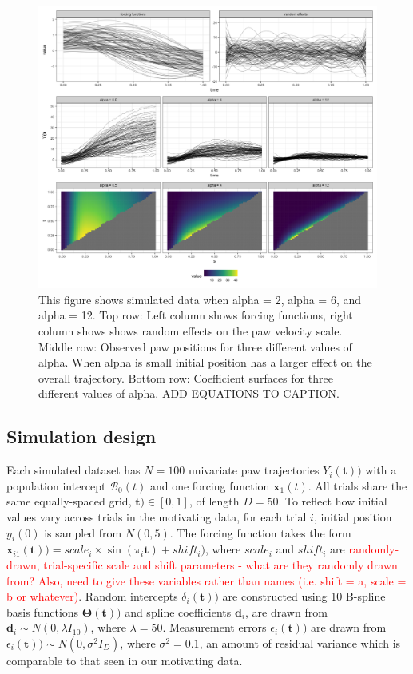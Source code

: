 \documentclass[preprint]{JASA}
\begin{document}
\begin{figure}
\includegraphics[width=\reprintcolumnwidth]{../output/fig_simdata_RE-1} \caption{This figure shows simulated data when alpha = 2, alpha = 6, and alpha = 12. Top row: Left column shows forcing functions, right column shows shows random effects on the paw velocity scale. Middle row: Observed paw positions for three different values of alpha. When alpha is small initial position has a larger effect on the overall trajectory.  Bottom row: Coefficient surfaces for three different values of alpha.  ADD EQUATIONS TO CAPTION.}\label{fig:sim_data}
\end{figure}

\hypertarget{simulation-design}{%
\subsection{Simulation design}\label{simulation-design}}

Each simulated dataset has \(N = 100\) univariate paw trajectories
\(Y_i(\mathbf{t}))\) with a population intercept \(\mathcal{B}_0(t)\)
and one forcing function \(\mathbf{x}_1(t)\). All trials share the same
equally-spaced grid, \(\mathbf{t}) \in [0, 1]\), of length \(D = 50\).
To reflect how initial values vary across trials in the motivating data,
for each trial \(i\), initial position \(y_i(0)\) is sampled from
\(N(0, 5)\). The forcing function takes the form
\(\mathbf{x}_{i1}(\mathbf{t})) = scale_i \times \sin(\pi_i \mathbf{t}) + shift_i)\),
where \(scale_i\) and \(shift_i\) are
\textcolor{red}{randomly-drawn, trial-specific scale and shift parameters - what are they randomly drawn from? Also, need to give these variables rather than names (i.e. shift = a, scale = b or whatever)}.
Random intercepts \(\delta_i(\mathbf{t}))\) are constructed using 10
B-spline basis functions \(\mathbf{\Theta}(\mathbf{t}))\) and spline
coefficients \(\mathbf{d}_i\), are drawn from
\(\mathbf{d}_i \sim N(0, \lambda I_{10})\), where \(\lambda = 50\).
Measurement errors \(\epsilon_i(\mathbf{t}))\) are drawn from
\(\epsilon_i(\mathbf{t})) \sim N(0, \sigma^2 I_{D})\), where
\(\sigma^2 = 0.1\), an amount of residual variance which is comparable
to that seen in our motivating data.
\end{document}
